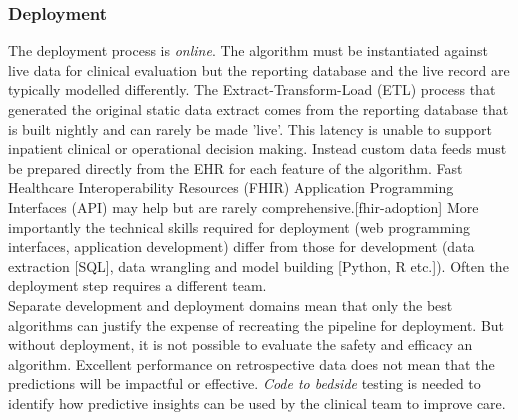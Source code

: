 \documentclass[pmlr,twocolumn,10pt]{jmlr} %
\begin{document}
\subsubsection{Deployment}
The deployment process is \textit{online}. The algorithm must be instantiated against live data for clinical evaluation but the reporting database and the live record are typically modelled differently. The Extract-Transform-Load (ETL) process that generated the original static data extract comes from the reporting database that is built nightly and can rarely be made 'live'. This latency is unable to support inpatient clinical or operational decision making. Instead custom data feeds must be prepared directly from the EHR for each feature of the algorithm.\citep{sendak2020} Fast Healthcare Interoperability Resources (FHIR) Application Programming Interfaces (API) may help but are rarely comprehensive.[fhir-adoption] More importantly the technical skills required for deployment (web programming interfaces, application development) differ from those for development (data extraction [SQL], data wrangling and model building [Python, R etc.]). Often the deployment step requires a different team.\\
Separate development and deployment domains mean that only the best algorithms can justify the expense of recreating the pipeline for deployment. But without deployment, it is not possible to evaluate the safety and efficacy an algorithm. Excellent performance on retrospective data does not mean that the predictions will be impactful or effective.\citep{the2021} \textit{Code to bedside} testing is needed to identify how predictive insights can be used by the clinical team to improve care.


\end{document}
